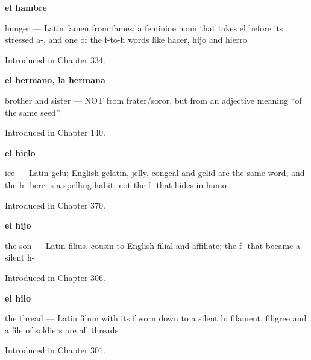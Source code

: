 \noindent\begin{minipage}[t]{\linewidth}
\raggedright
\textbf{el hambre}\par
\small hunger — Latin famen from fames; a feminine noun that takes el before its stressed a-, and one of the f-to-h words like hacer, hijo and hierro\par
\footnotesize Introduced in Chapter 334.
\end{minipage}\par\medskip

\noindent\begin{minipage}[t]{\linewidth}
\raggedright
\textbf{el hermano, la hermana}\par
\small brother and sister — NOT from frater/soror, but from an adjective meaning \textquotedblleft{}of the same seed\textquotedblright{}\par
\footnotesize Introduced in Chapter 140.
\end{minipage}\par\medskip

\noindent\begin{minipage}[t]{\linewidth}
\raggedright
\textbf{el hielo}\par
\small ice — Latin gelu; English gelatin, jelly, congeal and gelid are the same word, and the h- here is a spelling habit, not the f- that hides in humo\par
\footnotesize Introduced in Chapter 370.
\end{minipage}\par\medskip

\noindent\begin{minipage}[t]{\linewidth}
\raggedright
\textbf{el hijo}\par
\small the son --- Latin filius, cousin to English filial and affiliate; the f- that became a silent h-\par
\footnotesize Introduced in Chapter 306.
\end{minipage}\par\medskip

\noindent\begin{minipage}[t]{\linewidth}
\raggedright
\textbf{el hilo}\par
\small the thread — Latin filum with its f worn down to a silent h; filament, filigree and a file of soldiers are all threads\par
\footnotesize Introduced in Chapter 301.
\end{minipage}\par\medskip

